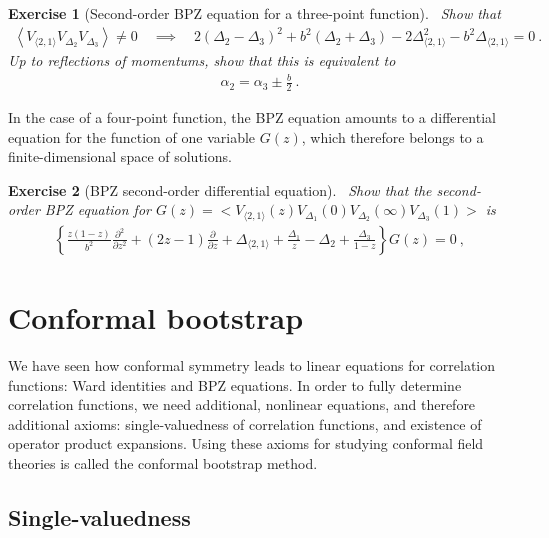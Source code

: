 \documentclass[12pt, a4paper]{article}
\theoremstyle{break}
\newtheorem{exo}{Exercise}[section]
\begin{document}
\begin{exo}[Second-order BPZ equation for a three-point function]
 ~\label{exo:bpz3pt}
 Show that 
\begin{align}
 \left< V_{\langle 2, 1 \rangle} V_{\Delta_2} V_{\Delta_3} \right> \neq 0 \quad \implies \quad 
 2(\Delta_2-\Delta_3)^2 +b^2(\Delta_2+\Delta_3) -2\Delta_{\langle 2, 1 \rangle}^2 -b^2\Delta_{\langle 2, 1 \rangle} = 0\ .
 \end{align}
 Up to reflections of momentums, show that this is equivalent to
 \begin{align}
 \alpha_2 = \alpha_3 \pm \frac{b}{2}\ .
 \label{eq:alpm}
\end{align}
\end{exo}

In the case of a four-point function, the BPZ equation amounts to a differential equation for the function of one variable $G(z)$, which therefore belongs to a finite-dimensional space of solutions.

\begin{exo}[BPZ second-order differential equation]
 ~\label{exo:bpz}
 Show that the second-order BPZ equation for $G(z)=\Big< V_{\langle 2, 1 \rangle}(z) V_{\Delta_1}(0)V_{\Delta_2}(\infty)V_{\Delta_3}(1) \Big>$ is
 \begin{align}
  \left\{ \frac{z(1-z)}{b^2}\frac{\partial^2}{\partial z^2} + (2z-1){\frac{\partial}{\partial z}} +\Delta_{\langle 2,1 \rangle} +\frac{\Delta_1}{z}-\Delta_2 + \frac{\Delta_3}{1-z}\right\} G(z)=0\ ,
\label{eq:ode}
 \end{align}
\end{exo}


\section{Conformal bootstrap}

We have seen how conformal symmetry leads to linear equations for correlation functions: Ward identities and BPZ equations. 
In order to fully determine correlation functions, we need additional, nonlinear equations, and therefore additional axioms: single-valuedness of correlation functions, and existence of operator product expansions. 
Using these axioms for studying conformal field theories is called the conformal bootstrap method. 

\subsection{Single-valuedness}\label{sec:sv}
\end{document}
